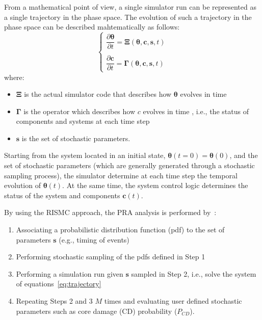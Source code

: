 From a mathematical point of view, a single simulator run can be represented as a single trajectory in the 
phase space. The evolution of such a trajectory in the phase space can be described mahtematically as follows:
\begin{equation}
  \begin{cases}
    \dfrac{\partial \boldsymbol \theta }{\partial t}  = \boldsymbol \Xi (\boldsymbol \theta , \boldsymbol c, \boldsymbol s , t)   \\ \\ 
    \dfrac{\partial \boldsymbol c }{\partial t}  = \boldsymbol \Gamma (\boldsymbol \theta , \boldsymbol c, \boldsymbol s , t) 
  \end{cases}    
  \label{eq:trajectory}
\end{equation}
where:
\begin{itemize}
  \item $\boldsymbol \Xi$ is the actual simulator code that describes how $\boldsymbol \theta$ evolves in time
  \item $\boldsymbol \Gamma$ is the operator which describes how $c$ evolves in time , i.e., the status 
        of components and systems at each time step
  \item $\boldsymbol s$ is the set of stochastic parameters. 
\end{itemize}

Starting from the system located in an initial state, $\boldsymbol \theta (t=0) = \boldsymbol \theta(0)$, 
and the set of stochastic parameters (which are generally generated through a stochastic sampling process), 
the simulator determine at each 
time step the temporal evolution of $\boldsymbol \theta (t)$. At the same time, the system control logic  
determines the status of the system and components $\boldsymbol c(t)$.
 
By using the RISMC approach, the PRA analysis is performed by~\cite{mandelliPSA2015}:
\begin{enumerate}
  \item Associating a probabilistic distribution function (pdf) to the set of parameters 
        $\boldsymbol s$ (e.g., timing of events)
  \item Performing stochastic sampling of the pdfs defined in Step 1
  \item Performing a simulation run given $\boldsymbol s$ sampled in Step 2, i.e., solve the 
        system of equations~\ref{eq:trajectory}
  \item Repeating Steps 2 and 3 $M$ times and evaluating user defined stochastic parameters such 
        as core damage (CD) probability ($P_{CD}$).
\end{enumerate}

